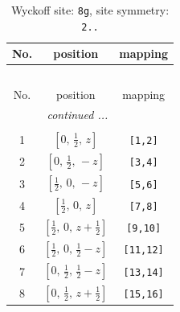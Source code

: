 \documentclass[fleqn,8pt]{jsarticle}
\begin{document}
\begin{longtable}{ccc}
\caption{Wyckoff site: {\tt 8g}, site symmetry: {\tt 2..}}
 \\
 \hline \hline
No. & position & mapping \\ \hline \endfirsthead

\multicolumn{2}{l}{\tablename\ \thetable{}} \\
 \hline \hline
No. & position & mapping \\ \hline \endhead

 \hline \hline
\multicolumn{2}{r}{\footnotesize\it continued ...} \\ \endfoot

 \hline \hline
\multicolumn{2}{r}{} \\ \endlastfoot

1 & $\left[ 0,\, \frac{1}{2},\, z \right]$ & {\tt [1,2]} \\ \hline
2 & $\left[ 0,\, \frac{1}{2},\, - z \right]$ & {\tt [3,4]} \\ \hline
3 & $\left[ \frac{1}{2},\, 0,\, - z \right]$ & {\tt [5,6]} \\ \hline
4 & $\left[ \frac{1}{2},\, 0,\, z \right]$ & {\tt [7,8]} \\ \hline
5 & $\left[ \frac{1}{2},\, 0,\, z + \frac{1}{2} \right]$ & {\tt [9,10]} \\ \hline
6 & $\left[ \frac{1}{2},\, 0,\, \frac{1}{2} - z \right]$ & {\tt [11,12]} \\ \hline
7 & $\left[ 0,\, \frac{1}{2},\, \frac{1}{2} - z \right]$ & {\tt [13,14]} \\ \hline
8 & $\left[ 0,\, \frac{1}{2},\, z + \frac{1}{2} \right]$ & {\tt [15,16]} \\
\end{longtable}
\renewcommand{\arraystretch}{1.2}
\end{document}
